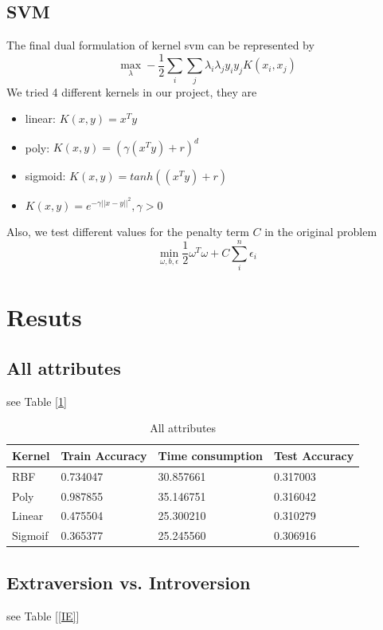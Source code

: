 \documentclass{article}
\begin{document}
\subsection{SVM}
The final dual formulation of kernel svm can be represented by 
\begin{equation}
  \max_\lambda-\frac{1}{2}\sum_i\sum_j\lambda_i\lambda_jy_iy_jK(x_i,x_j)
\end{equation}
We tried 4 different kernels in our project, they are
\begin{itemize}
  \item linear: $K(x,y) = x^Ty$
  \item poly: $K(x,y) = (\gamma (x^Ty)+r)^d$
  \item sigmoid: $K(x,y) = tanh((x^Ty)+r)$
  \item  $K(x,y) = e^{-\gamma ||x-y||^2}, \gamma>0$
\end{itemize}
Also, we test different values for the penalty term $C$ in the original problem
\begin{equation}
  \min_{\omega,b,\epsilon} \frac{1}{2}\omega^T\omega + C\sum_i^n\epsilon_i
\end{equation} 
\section{Resuts}
\subsection{All attributes}

see Table [\ref{all}]
\begin{table}
  \caption{All attributes}
  \label{all}
  \centering
  \begin{tabular}{llll}
    \toprule
    \cmidrule(r){1-2}
    Kernel     & Train Accuracy   & Time consumption  & Test Accuracy  \\
    \midrule
    RBF & 0.734047  & 30.857661 &   0.317003   \\
    Poly     & 0.987855 & 35.146751 &  0.316042    \\
    Linear     & 0.475504	& 25.300210      & 0.310279  \\
    Sigmoif & 0.365377 & 25.245560 & 0.306916\\
    \bottomrule
  \end{tabular}
\end{table}

\subsection{Extraversion vs. Introversion}
see Table [\ref{IE}]
\end{document}
